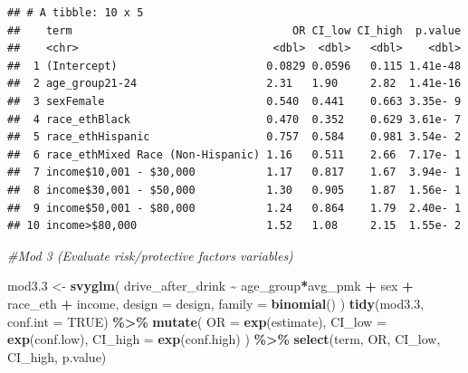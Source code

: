 \documentclass[
]{article}
\newenvironment{Shaded}{\begin{snugshade}}{\end{snugshade}}
\newcommand{\AttributeTok}[1]{\textcolor[rgb]{0.13,0.29,0.53}{#1}}
\newcommand{\CommentTok}[1]{\textcolor[rgb]{0.56,0.35,0.01}{\textit{#1}}}
\newcommand{\ConstantTok}[1]{\textcolor[rgb]{0.56,0.35,0.01}{#1}}
\newcommand{\FloatTok}[1]{\textcolor[rgb]{0.00,0.00,0.81}{#1}}
\newcommand{\FunctionTok}[1]{\textcolor[rgb]{0.13,0.29,0.53}{\textbf{#1}}}
\newcommand{\NormalTok}[1]{#1}
\newcommand{\OtherTok}[1]{\textcolor[rgb]{0.56,0.35,0.01}{#1}}
\newcommand{\SpecialCharTok}[1]{\textcolor[rgb]{0.81,0.36,0.00}{\textbf{#1}}}
\begin{document}
\begin{verbatim}
## # A tibble: 10 x 5
##    term                                  OR CI_low CI_high  p.value
##    <chr>                              <dbl>  <dbl>   <dbl>    <dbl>
##  1 (Intercept)                       0.0829 0.0596   0.115 1.41e-48
##  2 age_group21-24                    2.31   1.90     2.82  1.41e-16
##  3 sexFemale                         0.540  0.441    0.663 3.35e- 9
##  4 race_ethBlack                     0.470  0.352    0.629 3.61e- 7
##  5 race_ethHispanic                  0.757  0.584    0.981 3.54e- 2
##  6 race_ethMixed Race (Non-Hispanic) 1.16   0.511    2.66  7.17e- 1
##  7 income$10,001 - $30,000           1.17   0.817    1.67  3.94e- 1
##  8 income$30,001 - $50,000           1.30   0.905    1.87  1.56e- 1
##  9 income$50,001 - $80,000           1.24   0.864    1.79  2.40e- 1
## 10 income>$80,000                    1.52   1.08     2.15  1.55e- 2
\end{verbatim}

\begin{Shaded}
\begin{Highlighting}[]
\CommentTok{\#Mod 3 (Evaluate risk/protective factors variables) }

\NormalTok{mod3}\FloatTok{.3} \OtherTok{\textless{}{-}} \FunctionTok{svyglm}\NormalTok{(}
\NormalTok{  drive\_after\_drink }\SpecialCharTok{\textasciitilde{}}\NormalTok{ age\_group}\SpecialCharTok{*}\NormalTok{avg\_pmk }\SpecialCharTok{+}\NormalTok{ sex }\SpecialCharTok{+}\NormalTok{ race\_eth }\SpecialCharTok{+}\NormalTok{ income,}
  \AttributeTok{design =}\NormalTok{ design,}
  \AttributeTok{family =} \FunctionTok{binomial}\NormalTok{()}
\NormalTok{)  }
\FunctionTok{tidy}\NormalTok{(mod3}\FloatTok{.3}\NormalTok{, }\AttributeTok{conf.int =} \ConstantTok{TRUE}\NormalTok{) }\SpecialCharTok{\%\textgreater{}\%}
  \FunctionTok{mutate}\NormalTok{(}
    \AttributeTok{OR =} \FunctionTok{exp}\NormalTok{(estimate),}
    \AttributeTok{CI\_low =} \FunctionTok{exp}\NormalTok{(conf.low),}
    \AttributeTok{CI\_high =} \FunctionTok{exp}\NormalTok{(conf.high)}
\NormalTok{  ) }\SpecialCharTok{\%\textgreater{}\%}
  \FunctionTok{select}\NormalTok{(term, OR, CI\_low, CI\_high, p.value) }
\end{Highlighting}
\end{Shaded}
\end{document}
